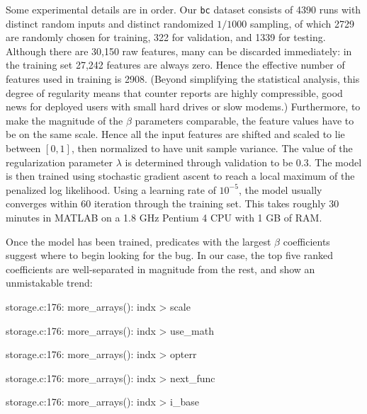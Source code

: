 Some experimental details are in order.  Our \texttt{bc} dataset
consists of 4390 runs with distinct random inputs and distinct
randomized $1/1000$ sampling, of which 2729 are randomly chosen for
training, 322 for validation, and 1339 for testing.  Although there
are 30,150 raw features, many can be discarded immediately: in the
training set 27,242 features are always zero.  Hence the effective
number of features used in training is 2908.  (Beyond simplifying the
statistical analysis, this degree of regularity means that counter
reports are highly compressible, good news for deployed users with
small hard drives or slow modems.)  Furthermore, to make the magnitude
of the $\beta$ parameters comparable, the feature values have to be on the
same scale.  Hence all the input features are shifted and scaled to
lie between $[0,1]$, then normalized to have unit sample
variance. The value of the regularization parameter $\lambda$ is determined
through validation to be $0.3$.  The model is then trained using
stochastic gradient ascent to reach a local maximum of the penalized
log likelihood.  Using a learning rate of $10^{-5}$, the model usually
converges within 60 iteration through the training set.  This takes
roughly 30 minutes in MATLAB on a 1.8 GHz Pentium 4 CPU with 1 GB of
RAM.



Once the model has been trained, predicates with the largest $\beta$
coefficients suggest where to begin looking for the bug.  In our case,
the top five ranked coefficients are well-separated in magnitude from
the rest, and show an unmistakable trend:

\begin{list}{.}{\setlength{\itemsep}{0pt}\setlength{\parsep}{0in}\ttfamily\small}
\item storage.c:176: more\_arrays(): indx > scale
\item storage.c:176: more\_arrays(): indx > use\_math
\item storage.c:176: more\_arrays(): indx > opterr
\item storage.c:176: more\_arrays(): indx > next\_func
\item storage.c:176: more\_arrays(): indx > i\_base
\end{list}


